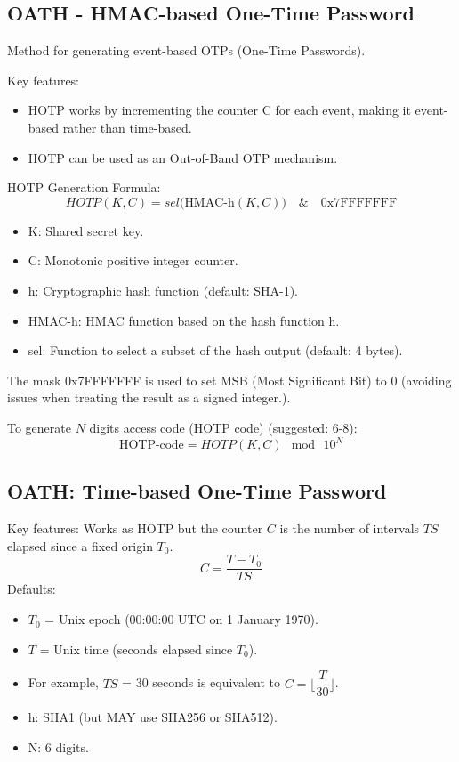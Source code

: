 \subsection{OATH - HMAC-based One-Time Password}
\begin{center}
    Method for generating event-based OTPs (One-Time Passwords).
\end{center}
Key features:
\begin{itemize}
    \item HOTP works by incrementing the counter  C  for each event, making it event-based rather than time-based.
    \item HOTP can be used as an Out-of-Band OTP mechanism.
\end{itemize}

\noindent HOTP Generation Formula:
\[HOTP(K,C)=sel\big(\text{HMAC-h}(K,C)\big)\quad \&\quad \text{0x7FFFFFFF}\]
\begin{itemize}
    \item K: Shared secret key.
    \item C: Monotonic positive integer counter.
    \item h: Cryptographic hash function (default: SHA-1).
    \item HMAC-h: HMAC function based on the hash function h.
    \item sel: Function to select a subset of the hash output (default: 4 bytes).
\end{itemize}
The mask 0x7FFFFFFF is used to set MSB (Most Significant Bit) to 0 (avoiding issues when treating the result as a signed integer.).

\hspace*{1cm}

\noindent To generate $N$ digits access code (HOTP code) (suggested: 6-8):
\[\text{HOTP-code} = HOTP (K, C) \mod \, 10^N\]

\subsection{OATH: Time-based One-Time Password}
Key features:
Works as HOTP but the counter $C$ is the number of intervals $TS$ elapsed since a fixed origin $T_0$.
    \[
        C= \dfrac{T-T_0}{TS}
    \]
\noindent Defaults:
\begin{itemize}
    \item $T_0$ = Unix epoch (00:00:00 UTC on 1 January 1970).
    \item $T$ = Unix time (seconds elapsed since $T_0$).
    \item For example, $TS$ = 30 seconds is equivalent to $C=\lfloor\dfrac{T}{30}\rfloor$.
    \item h: SHA1 (but MAY use SHA256 or SHA512).
    \item N: 6 digits.
\end{itemize}
